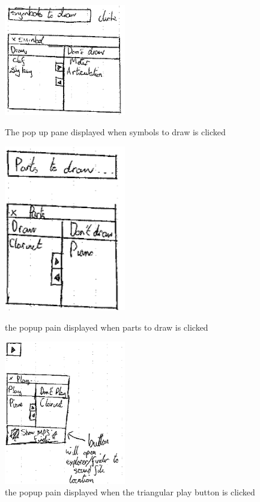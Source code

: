 \begin{appendices}
\begin{figure}[H]
\begin{minipage}{160pt}
\includegraphics[width=150pt]{designs/symbol_draw}
\caption{The pop up pane displayed when symbols to draw is clicked}	
\label{fig:symbols}
\end{minipage}
\begin{minipage}{160pt}
\centering
\includegraphics[width=150pt]{designs/part_draw}
\caption{the popup pain displayed when parts to draw is clicked}	
\label{fig:partpain}
\end{minipage}
\begin{minipage}{160pt}
\includegraphics[width=150pt]{designs/play}
\caption{the popup pain displayed when the triangular play button is clicked}
\label{fig:play}
	

\end{minipage}
\end{figure}
\end{appendices}
